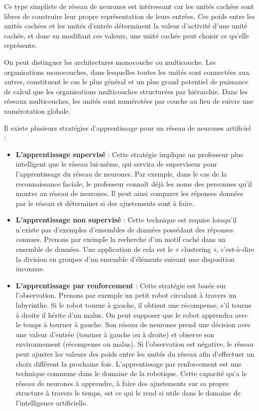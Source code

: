 \documentclass[a4paper, 12pt]{article} %
\begin{document}
Ce type simpliste de réseau de neurones est intéressant car les unités cachées sont libres de construire leur propre représentation de leurs entrées. Ces poids entre les unités cachées et les unités d’entrée déterminent la valeur d’activité d’une unité cachée, et donc en modifiant ces valeurs, une unité cachée peut choisir ce qu’elle représente.

On peut distinguer les architectures monocouche ou multicouche. Les organisations monocouches, dans lesquelles toutes les unités sont connectées aux autres, constituent le cas le plus général et un plus grand potentiel de puissance de calcul que les organisations multicouches structurées par hiérarchie. Dans les réseaux multicouches, les unités sont numérotées par couche au lieu de suivre une numérotation globale.

Il existe plusieurs stratégies d’apprentissage pour un réseau de neurones artificiel\cite{shiffman2012nature} :
\begin{itemize}
	\item \textbf{L’apprentissage supervisé} : Cette stratégie implique un professeur plus intelligent que le réseau lui-même, qui servira de superviseur pour l’apprentissage du réseau de neurones. Par exemple, dans le cas de la reconnaissance faciale, le professeur connaît déjà les noms des personnes qu’il montre au réseau de neurones. Il peut ainsi comparer les réponses données par le réseau et déterminer si des ajustements sont à faire.
	
	\item \textbf{L’apprentissage non supervisé} : Cette technique est requise lorsqu’il n’existe pas d’exemples d’ensembles de données possédant des réponses connues. Prenons par exemple la recherche d’un motif caché dans un ensemble de données. Une application de cela est le « clustering », c’est-à-dire la division en groupes d’un ensemble d’éléments suivant une disposition inconnue.
		
	\item \textbf{L’apprentissage par renforcement} : Cette stratégie est basée sur l’observation. Prenons par exemple un petit robot circulant à travers un labyrinthe. Si le robot tourne à gauche, il obtient une récompense, s’il tourne à droite il hérite d’un malus. On peut supposer que le robot apprendra avec le temps à tourner à gauche. Son réseau de neurones prend une décision avec une valeur d’entrée (tourner à gauche ou à droite) et observe son environnement (récompense ou malus). Si l’observation est négative, le réseau peut ajuster les valeurs des poids entre les unités du réseau afin d’effectuer un choix différent la prochaine fois. L’apprentissage par renforcement est une technique commune dans le domaine de la robotique.
	Cette capacité qu’a le réseau de neurones à apprendre, à faire des ajustements sur sa propre structure à travers le temps, est ce qui le rend si utile dans le domaine de l’intelligence artificielle.
\end{itemize}
\end{document}
